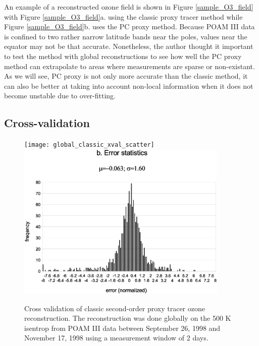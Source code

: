 An example of a reconstructed ozone field is shown in Figure \ref{sample_O3_field}
with Figure \ref{sample_O3_field}a. using the classic proxy tracer method
while Figure \ref{sample_O3_field}b. uses the PC proxy method.
Because POAM III data is confined to two rather narrow latitude bands near
the poles, values near the equator may not be that accurate.
Nonetheless, the author thought it important to test the method with global
reconstructions to see how well the PC proxy method can extrapolate
to areas where measurements are sparse or non-existant.
As we will see, PC proxy is not only more accurate than the classic method,
it can also be better at taking into account non-local information
when it does not become unstable due to over-fitting.

\subsection{Cross-validation}

\label{cross_validation}

\begin{figure}
  \centering
  \texttt{[image: global\_classic\_xval\_scatter]}
  \includegraphics[width=0.9\textwidth]{global_classic_xval_error}
  \caption{Cross validation of classic second-order proxy tracer ozone reconstruction. The reconstruction was done globally on the 500 K isentrop from POAM III data between September 26, 1998 and November 17, 1998 using a measurement window of 2 days.}
  \label{classic_cross_validation}
\end{figure}

